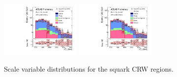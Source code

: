 \begin{figure}[tbph]
\begin{center}
\includegraphics[width=0.35\textwidth]{figures/ATLAS-CONF-2016-078_INT/N-1Plots/AtlasStyle/Preliminary/CRW_SRJigsawSRS3a_LastCut_CRW_minusone}
\includegraphics[width=0.35\textwidth]{figures/ATLAS-CONF-2016-078_INT/N-1Plots/AtlasStyle/Preliminary/CRW_SRJigsawSRS3b_LastCut_CRW_minusone}
\end{center}
\caption{Scale variable distributions for the squark CRW regions.}
\label{fig:CRW_SRJigsawSRS2b_LastCut_CRW_minusone}
\end{figure}

